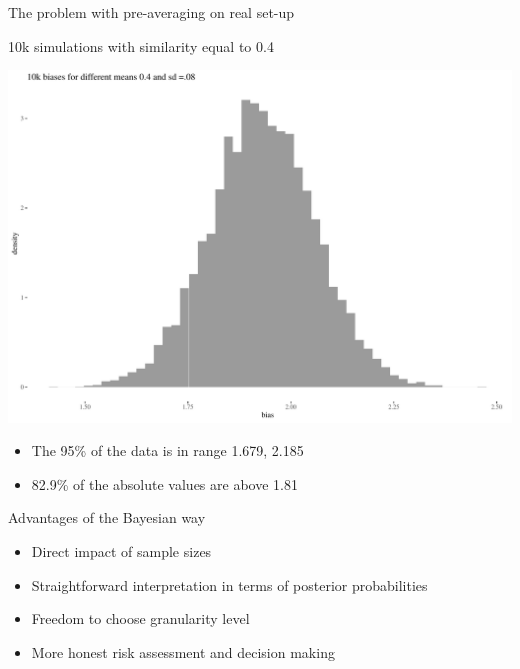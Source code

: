\documentclass[
  10pt,
  ignorenonframetext,
  x11names, dvipsnames, bibspacing,natbib]{beamer}
\providecommand{\tightlist}{%
  \setlength{\itemsep}{0pt}\setlength{\parskip}{0pt}}
\begin{document}
\begin{frame}{The problem with pre-averaging on real set-up}
\protect\hypertarget{the-problem-with-pre-averaging-on-real-set-up-3}{}
\begin{block}{10k simulations with similarity equal to 0.4}
\protect\hypertarget{k-simulations-with-similarity-equal-to-0.4}{}
\vspace{1mm}
\footnotesize

\begin{center}\includegraphics[width=0.8\linewidth]{presentationBoston_files/figure-beamer/unnamed-chunk-13-1} \end{center}
\vspace{1mm}
\footnotesize

\normalsize
\pause

\footnotesize

\vspace{-2mm}

\begin{itemize}
\tightlist
\item
  The 95\% of the data is in range 1.679, 2.185
\item
  82.9\% of the absolute values are above 1.81
\end{itemize}
\end{block}
\end{frame}

\begin{frame}{Advantages of the Bayesian way}
\protect\hypertarget{advantages-of-the-bayesian-way}{}
\begin{itemize}
\tightlist
\item
  Direct impact of sample sizes
\item
  Straightforward interpretation in terms of posterior probabilities
\item
  Freedom to choose granularity level
\item
  More honest risk assessment and decision making
\end{itemize}
\end{frame}
\end{document}
